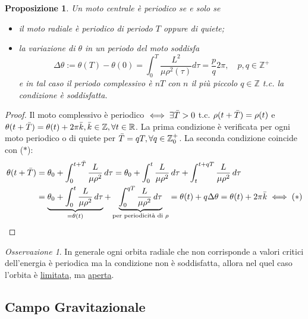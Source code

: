 \documentclass{book}
\theoremstyle{plain}
\theoremstyle{plain}
\theoremstyle{plain}
\theoremstyle{plain}
\theoremstyle{plain}
\newtheorem{prop}{Proposizione}[chapter]
\theoremstyle{definition}
\theoremstyle{remark}
\newtheorem*{oss}{Osservazione}
\theoremstyle{definition}
\begin{document}
\begin{prop}
     Un moto centrale è periodico se e solo se
     \begin{itemize}
         \item  il moto radiale è periodico di periodo $T$ oppure di quiete;
         \item la variazione di $\theta$ in un periodo del moto soddisfa
         \begin{displaymath}
             \Delta\theta := \theta(T)-\theta(0) = \int_0^T\frac{L^2}{\mu\rho^2(\tau)}d\tau=\frac{p}{q}2\pi, \quad p,q\in\mathbb{Z}^+
         \end{displaymath}
         e in tal caso il periodo complessivo è $nT$ con $n$ il più piccolo $q\in\mathbb{Z}$ t.c. la condizione è soddisfatta.
     \end{itemize}
\end{prop}

\begin{proof}
    Il moto complessivo è periodico $\iff \exists\Bar{T}>0$ t.c. $\rho(t+\Bar{T})=\rho(t)$ e $\theta(t+\Bar{T})=\theta(t)+2\pi\Bar{k}, \Bar{k}\in\mathbb{Z}, \forall t\in\mathbb{R}$. La prima condizione è verificata per ogni moto periodico o di quiete per $\Bar{T}=qT, \forall q\in\mathbb{Z}_0^+$. La seconda condizione coincide con ($*$):
    \[
    \begin{split}
        \theta(t+\Bar{T})&=\theta_0+\int_0^{t+\Bar{T}} \frac{L}{\mu\rho^2}\,d\tau=\theta_0+\int_0^t \frac{L}{\mu\rho^2}\,d\tau+\int_t^{t+qT} \frac{L}{\mu\rho^2}\,d\tau \\
        &=\underbrace{\theta_0+\int_0^t \frac{L}{\mu\rho^2}\,d\tau}_{=\theta(t)}+\underbrace{\int_0^{qT} \frac{L}{\mu\rho^2}\,d\tau}_{\text{per periodicità di $\rho$}} =\theta(t)+q\Delta\theta=\theta(t)+2\pi\Bar{k} \iff (*)
    \end{split}
    \]
\end{proof}

\begin{oss}
     In generale ogni orbita radiale che non corrisponde a valori critici dell'energia è periodica ma la condizione non è soddisfatta, allora nel quel caso l'orbita è \underline{limitata}, ma \underline{aperta}.
\end{oss}

\subsection{Campo Gravitazionale}
\end{document}
